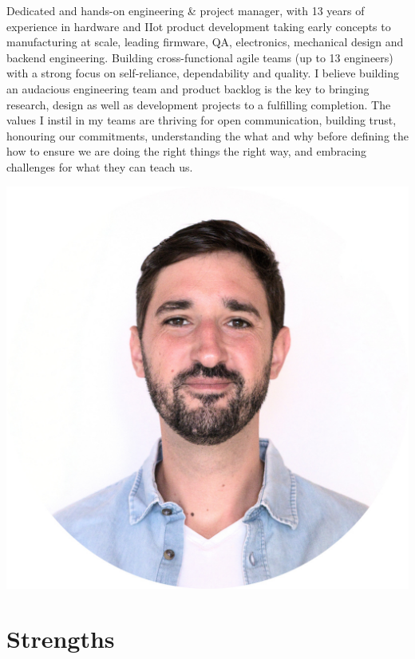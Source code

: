 \documentclass[10pt,a4paper]{moderncv}
\begin{document}
\begin{minipage}{0.80\textwidth}
  Dedicated and hands-on engineering \& project manager, with 13 years of experience in hardware and IIot product development taking early concepts to manufacturing at scale, leading firmware, QA, electronics, mechanical design and backend engineering. Building cross-functional agile teams (up to 13 engineers) with a strong focus on self-reliance, dependability and quality. I believe building an audacious engineering team and product backlog is the key to bringing research, design as well as development projects to a fulfilling completion. The values I instil in my teams are thriving for open communication, building trust, honouring our commitments, understanding the what and why before defining the how to ensure we are doing the right things the right way, and embracing challenges for what they can teach us.
\end{minipage}
\hfill
\begin{minipage}{0.18\textwidth}
  \includegraphics[width=\linewidth]{portrait_round.jpg}\vspace{1.1em}
\end{minipage}

\section{Strengths}
\end{document}
